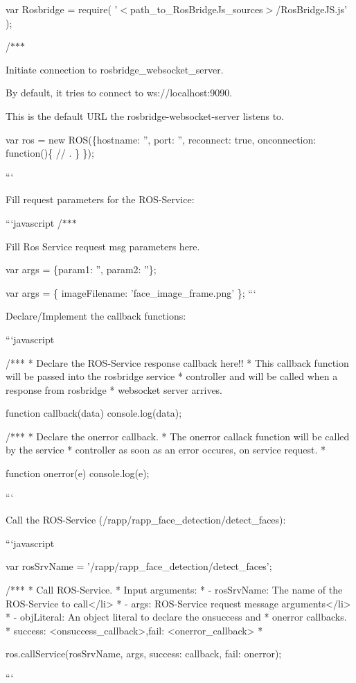 var Rosbridge = require( '$<$path\-\_\-to\-\_\-\-Ros\-Bridge\-Js\-\_\-sources$>$/\-Ros\-Bridge\-J\-S.js' );

/$\ast$$\ast$$\ast$
\begin{DoxyItemize}
\item Initiate connection to rosbridge\-\_\-websocket\-\_\-server.
\item 
\item By default, it tries to connect to ws\-://localhost\-:9090.
\item This is the default U\-R\-L the rosbridge-\/websocket-\/server listens to.
\end{DoxyItemize}

var ros = new R\-O\-S(\{hostname\-: '', port\-: '', reconnect\-: true, onconnection\-: function()\{ // . \} \});

```

Fill request parameters for the R\-O\-S-\/\-Service\-:

```javascript /$\ast$$\ast$$\ast$
\begin{DoxyItemize}
\item Fill Ros Service request msg parameters here.
\item var args = \{param1\-: '', param2\-: ''\};
\item var args = \{ image\-Filename\-: 'face\-\_\-image\-\_\-frame.\-png' \}; ```
\end{DoxyItemize}

Declare/\-Implement the callback functions\-:

```javascript \begin{DoxyVerb}  /***
   * Declare the ROS-Service response callback here!!
   * This callback function will be passed into the rosbridge service
   * controller and will be called when a response from rosbridge
   * websocket server arrives.

  function callback(data){
     console.log(data);
  }

  /***
   * Declare the onerror callback.
   * The onerror callack function will be called by the service
   * controller as soon as an error occures, on service request.
   *

  function onerror(e){
    console.log(e);
  }
\end{DoxyVerb}


```

Call the R\-O\-S-\/\-Service (/rapp/rapp\-\_\-face\-\_\-detection/detect\-\_\-faces)\-:

```javascript \begin{DoxyVerb} var rosSrvName = '/rapp/rapp_face_detection/detect_faces';

  /***
   * Call ROS-Service.
   * Input arguments:
   *   - rosSrvName: The name of the ROS-Service to call</li>
   *   - args: ROS-Service request message arguments</li>
   *   - objLiteral: An object literal to declare the onsuccess and
   *        onerror callbacks.
   *      { success: <onsuccess_callback>,fail: <onerror_callback> }
   *

  ros.callService(rosSrvName, args,
    {success: callback, fail: onerror});
\end{DoxyVerb}
 ```

